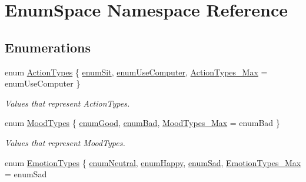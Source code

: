 \hypertarget{namespace_enum_space}{\section{Enum\-Space Namespace Reference}
\label{namespace_enum_space}
}
\subsection*{Enumerations}
\begin{DoxyCompactItemize}
\item 
enum \hyperlink{namespace_enum_space_a12df93435ce38acf7185878d223161f8}{Action\-Types} \{ \hyperlink{namespace_enum_space_a12df93435ce38acf7185878d223161f8adff614b6d8adf51d682ef978e9fd2dc6}{enum\-Sit}, 
\hyperlink{namespace_enum_space_a12df93435ce38acf7185878d223161f8af9e0413bd72602fb5dbdfc7a0bc161fd}{enum\-Use\-Computer}, 
\hyperlink{namespace_enum_space_a12df93435ce38acf7185878d223161f8a9eefa7285fdb8bcd5666f4345c47842e}{Action\-Types\-\_\-\-Max} = enum\-Use\-Computer
 \}
\begin{DoxyCompactList}\small\item\em Values that represent Action\-Types. \end{DoxyCompactList}\item 
enum \hyperlink{namespace_enum_space_a9ebbeb71239794b3dd224f385dc2e063}{Mood\-Types} \{ \hyperlink{namespace_enum_space_a9ebbeb71239794b3dd224f385dc2e063a5f111f8032fec520b1168e1f63cb65d9}{enum\-Good}, 
\hyperlink{namespace_enum_space_a9ebbeb71239794b3dd224f385dc2e063a203029bed076f762bf355048f03076a8}{enum\-Bad}, 
\hyperlink{namespace_enum_space_a9ebbeb71239794b3dd224f385dc2e063abcfe71b3345d1a61e7ee71a95ec86f40}{Mood\-Types\-\_\-\-Max} = enum\-Bad
 \}
\begin{DoxyCompactList}\small\item\em Values that represent Mood\-Types. \end{DoxyCompactList}\item 
enum \hyperlink{namespace_enum_space_ae9fbdf11c99f56b66e781ed4332677c5}{Emotion\-Types} \{ \hyperlink{namespace_enum_space_ae9fbdf11c99f56b66e781ed4332677c5a824ce84bd64a22e272c37342fcd2c9bf}{enum\-Neutral}, 
\hyperlink{namespace_enum_space_ae9fbdf11c99f56b66e781ed4332677c5af720deede2b36eca78e5b2b8da7f60df}{enum\-Happy}, 
\hyperlink{namespace_enum_space_ae9fbdf11c99f56b66e781ed4332677c5a5583bf4666f52db05ad498976895ace6}{enum\-Sad}, 
\hyperlink{namespace_enum_space_ae9fbdf11c99f56b66e781ed4332677c5afc3b3151b74f9c02bbaef9acb1a869ee}{Emotion\-Types\-\_\-\-Max} = enum\-Sad

\end{DoxyCompactItemize}
